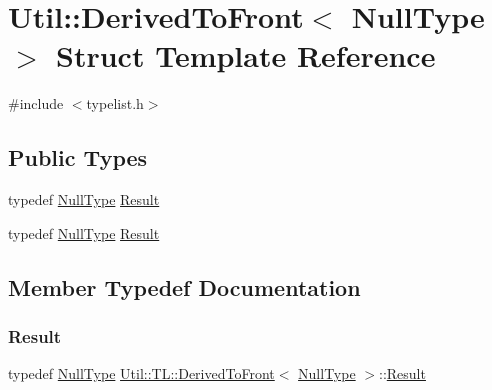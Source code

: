 \hypertarget{structUtil_1_1TL_1_1DerivedToFront_3_01NullType_01_4}{}\section{Util\+:\+:Derived\+To\+Front$<$ Null\+Type $>$ Struct Template Reference}
\label{structUtil_1_1TL_1_1DerivedToFront_3_01NullType_01_4}


{\ttfamily \#include $<$typelist.\+h$>$}

\subsection*{Public Types}
\begin{DoxyCompactItemize}
\item 
typedef \mbox{\hyperlink{classUtil_1_1NullType}{Null\+Type}} \mbox{\hyperlink{structUtil_1_1TL_1_1DerivedToFront_3_01NullType_01_4_aabbce675be682669b47f114d57de74eb}{Result}}
\item 
typedef \mbox{\hyperlink{classUtil_1_1NullType}{Null\+Type}} \mbox{\hyperlink{structUtil_1_1TL_1_1DerivedToFront_3_01NullType_01_4_aabbce675be682669b47f114d57de74eb}{Result}}
\end{DoxyCompactItemize}


\subsection{Member Typedef Documentation}
\mbox{\label{structUtil_1_1TL_1_1DerivedToFront_3_01NullType_01_4_aabbce675be682669b47f114d57de74eb}} 
\subsubsection{\texorpdfstring{Result}{Result}\hspace{0.1cm}{\footnotesize\ttfamily [1/2]}}
{\footnotesize\ttfamily typedef \mbox{\hyperlink{classUtil_1_1NullType}{Null\+Type}} \mbox{\hyperlink{structUtil_1_1TL_1_1DerivedToFront}{Util\+::\+T\+L\+::\+Derived\+To\+Front}}$<$ \mbox{\hyperlink{classUtil_1_1NullType}{Null\+Type}} $>$\+::\mbox{\hyperlink{structUtil_1_1TL_1_1DerivedToFront_3_01NullType_01_4_aabbce675be682669b47f114d57de74eb}{Result}}}

